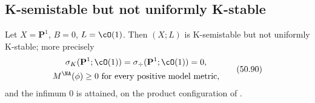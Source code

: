 \subsection{K-semistable but not uniformly K-stable}
\label{sec:ch50-ex-semistable}

\par\noindent\begin{minipage}{\textwidth}
\begin{example}
\label{ex:ch50-semistable-not-uniform}
Let $X=\mathbf P^1$, $B=0$, $L=\cO(1)$.  Then $(X;L)$ is
K-semistable but not uniformly K-stable; more precisely
\[
 \begin{gathered}
 \sigma_K(\mathbf P^1;\cO(1))=\sigma_{\div}(\mathbf P^1;\cO(1))=0,\\
 M^{\NA}(\phi)\ge0\ \text{for every positive model metric},
 \end{gathered}
\tag{50.90}\label{eq:ch50-p1-thresholds}
\]
and the infimum $0$ is attained, on the product configuration of
.
\end{example}
\end{minipage}\par\medskip

